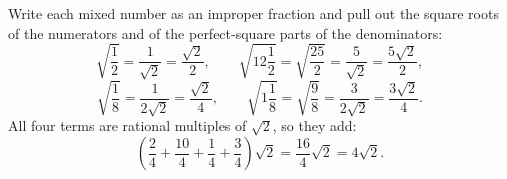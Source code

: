 Write each mixed number as an improper fraction and pull out the square roots of the numerators and of the perfect-square parts of the denominators:
\[
\sqrt{\dfrac{1}{2}}=\dfrac{1}{\sqrt2}=\dfrac{\sqrt2}{2},\qquad
\sqrt{12\dfrac{1}{2}}=\sqrt{\dfrac{25}{2}}=\dfrac{5}{\sqrt2}=\dfrac{5\sqrt2}{2},
\]
\[
\sqrt{\dfrac{1}{8}}=\dfrac{1}{2\sqrt2}=\dfrac{\sqrt2}{4},\qquad
\sqrt{1\dfrac{1}{8}}=\sqrt{\dfrac{9}{8}}=\dfrac{3}{2\sqrt2}=\dfrac{3\sqrt2}{4}.
\]
All four terms are rational multiples of $\sqrt2$, so they add:
\[
\left(\dfrac{2}{4}+\dfrac{10}{4}+\dfrac{1}{4}+\dfrac{3}{4}\right)\sqrt2=\dfrac{16}{4}\sqrt2=\boxed{4\sqrt2}.
\]
